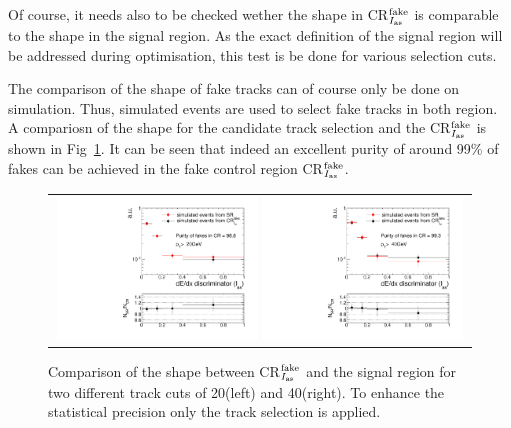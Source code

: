 Of course, it needs also to be checked wether the \ias shape in CR$_{I_{\text{as}}}^{\text{fake}}$ is comparable to the \ias shape in the signal region.
As the exact definition of the signal region will be addressed during optimisation, this test is be done for various \pt selection cuts.

The comparison of the \ias shape of fake tracks can of course only be done on simulation.
Thus, simulated \WJets events are used to select fake tracks in both region.
A compariosn of the shape for the candidate track selection and the CR$_{I_{\text{as}}}^{\text{fake}}$ is shown in Fig~\ref{fig:IasSRCRFakes}.
It can be seen that indeed an excellent purity of around 99\% of fakes can be achieved in the \ias fake control region CR$_{I_{\text{as}}}^{\text{fake}}$.


\begin{figure}[!t]
  \centering 
  \begin{tabular}{c}
    \includegraphics[width=0.49\textwidth]{figures/analysis/Background/hASmi_SRbinning_d0Inverted_fakes_ECalaoLe5_trackPtGt20_MC_CR_MC_SR.pdf}
    \includegraphics[width=0.49\textwidth]{figures/analysis/Background/hASmi_SRbinning_d0Inverted_fakes_ECalaoLe5_trackPtGt40_MC_CR_MC_SR.pdf}
  \end{tabular}
  \caption{Comparison of the \ias shape between CR$_{I_{\text{as}}}^{\text{fake}}$ and the signal region for two different track \pt cuts of 20\gev (left) and 40\gev (right). To enhance the statistical precision only the track selection is applied.}
  \label{fig:IasSRCRFakes}
\end{figure}

